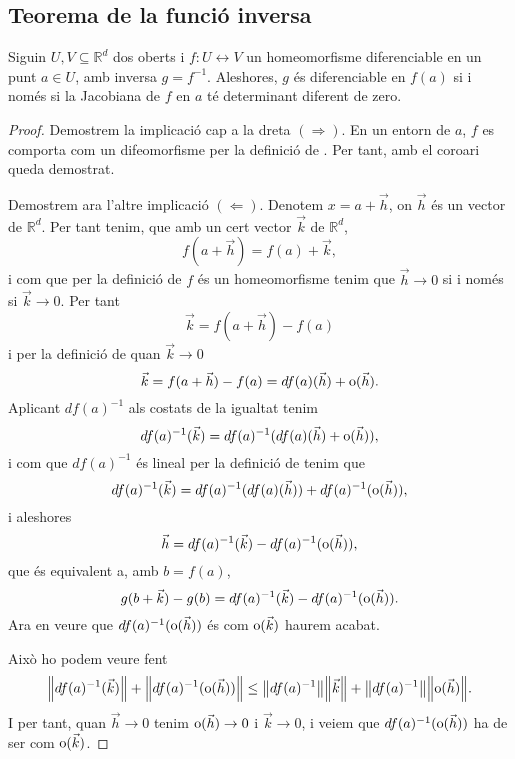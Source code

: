 \documentclass[../Apunts.tex]{subfiles}
\begin{document}
	\subsection{Teorema de la funció inversa}
	\begin{proposition}\label{prop:homeomorfisme a difeomorfisme}
		Siguin \(U,V\subseteq\mathbb{R}^{d}\) dos oberts i \(f\colon U\leftrightarrow V\) un homeomorfisme diferenciable en un punt \(a\in U\), amb inversa \(g=f^{-1}\). Aleshores, \(g\) és diferenciable en \(f(a)\) si i només si la Jacobiana de \(f\) en \(a\) té determinant diferent de zero.
		\begin{proof}
			Demostrem la implicació cap a la dreta \((\Rightarrow)\). En un entorn de \(a\), \(f\) es comporta com un difeomorfisme per la definició de . Per tant, amb el coro{\lgem}ari  queda demostrat.
			
			Demostrem ara l'altre implicació \((\Leftarrow)\). Denotem \(x=a+\vec{h}\), on \(\vec{h}\) és un vector de \(\mathbb{R}^{d}\). Per tant tenim, que amb un cert vector \(\vec{k}\) de \(\mathbb{R}^{d}\),
			\[f(a+\vec{h})=f(a)+\vec{k},\]
			i com que per la definició de  \(f\) és un homeomorfisme  tenim que \(\vec{h}\to0\) si i només si \(\vec{k}\to0\). Per tant
			\[\vec{k}=f(a+\vec{h})-f(a)\]
			i per la definició de  quan \(\vec{k}\to0\)
			\[\vec{k}=f(a+\vec{h})-f(a)=df(a)(\vec{h})+\operatorname{o}(\vec{h}).\]
			Aplicant \(df(a)^{-1}\) als costats de la igualtat tenim
			\[df(a)^{-1}(\vec{k})=df(a)^{-1}(df(a)(\vec{h})+\operatorname{o}(\vec{h})),\]
			i com que \(df(a)^{-1}\) és lineal per la definició de  tenim que
			\[df(a)^{-1}(\vec{k})=df(a)^{-1}(df(a)(\vec{h}))+df(a)^{-1}(\operatorname{o}(\vec{h})),\]
			i aleshores
			\[\vec{h}=df(a)^{-1}(\vec{k})-df(a)^{-1}(\operatorname{o}(\vec{h})),\]
			que és equivalent a, amb \(b=f(a)\),
			\[g(b+\vec{k})-g(b)=df(a)^{-1}(\vec{k})-df(a)^{-1}(\operatorname{o}(\vec{h})).\]
			Ara en veure que \(df(a)^{-1}(\operatorname{o}(\vec{h}))\) és com \(\operatorname{o}(\vec{k})\) haurem acabat.
			
			Això ho podem veure fent
			\[\norm{df(a)^{-1}(\vec{k})}+\norm{df(a)^{-1}(\omicron(\vec{h}))}\leq\norm{df(a)^{-1}}\norm{\vec{k}}+\norm{df(a)^{-1}}\norm{\omicron(\vec{h})}.\]
			I per tant, quan \(\vec{h}\to0\) tenim \(\operatorname{o}(\vec{h})\to0\) i \(\vec{k}\to0\), i veiem que \(df(a)^{-1}(\operatorname{o}(\vec{h}))\) ha de ser com \(\operatorname{o}(\vec{k})\). %
		\end{proof}
	\end{proposition}
\end{document}
